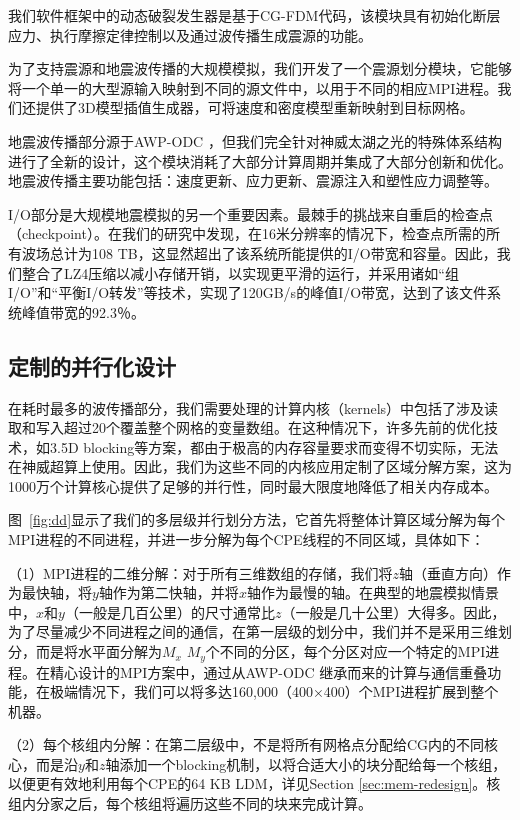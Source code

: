 \documentclass[degree=doctor]{thuthesis}
\begin{document}
我们软件框架中的动态破裂发生器是基于CG-FDM代码\citep{zhang2014three}，该模块具有初始化断层应力、执行摩擦定律控制以及通过波传播生成震源的功能。

为了支持震源和地震波传播的大规模模拟，我们开发了一个震源划分模块，它能够将一个单一的大型源输入映射到不同的源文件中，以用于不同的相应MPI进程。我们还提供了3D模型插值生成器，可将速度和密度模型重新映射到目标网格。

地震波传播部分源于AWP-ODC \citep {cui2010scalable}，但我们完全针对神威太湖之光的特殊体系结构进行了全新的设计，这个模块消耗了大部分计算周期并集成了大部分创新和优化。地震波传播主要功能包括：速度更新、应力更新、震源注入和塑性应力调整等。

I/O部分是大规模地震模拟的另一个重要因素。最棘手的挑战来自重启的检查点（checkpoint）。在我们的研究中发现，在16米分辨率的情况下，检查点所需的所有波场总计为108 TB，这显然超出了该系统所能提供的I/O带宽和容量。因此，我们整合了LZ4压缩以减小存储开销，以实现更平滑的运行，并采用诸如“组I/O”和“平衡I/O转发”等技术，实现了120GB/s的峰值I/O带宽，达到了该文件系统峰值带宽的92.3％。

\subsection{定制的并行化设计}
\label{sec:parallel}

在耗时最多的波传播部分，我们需要处理的计算内核（kernels）中包括了涉及读取和写入超过20个覆盖整个网格的变量数组。在这种情况下，许多先前的优化技术，如3.5D blocking等方案\citep {nguyen20103}，都由于极高的内存容量要求而变得不切实际，无法在神威超算上使用。因此，我们为这些不同的内核应用定制了区域分解方案，这为1000万个计算核心提供了足够的并行性，同时最大限度地降低了相关内存成本。

图~\ref{fig:dd}显示了我们的多层级并行划分方法，它首先将整体计算区域分解为每个MPI进程的不同进程，并进一步分解为每个CPE线程的不同区域，具体如下：

（1）MPI进程的二维分解：对于所有三维数组的存储，我们将$ z $轴（垂直方向）作为最快轴，将$ y $轴作为第二快轴，并将$ x $轴作为最慢的轴。在典型的地震模拟情景中，$ x $和$ y $（一般是几百公里）的尺寸通常比$ z $（一般是几十公里）大得多。因此，为了尽量减少不同进程之间的通信，在第一层级的划分中，我们并不是采用三维划分，而是将水平面分解为$ M_x $ $ M_y $个不同的分区，每个分区对应一个特定的MPI进程。在精心设计的MPI方案中，通过从AWP-ODC \citep{cui2010scalable}继承而来的计算与通信重叠功能，在极端情况下，我们可以将多达160,000（400×400）个MPI进程扩展到整个机器。

（2）每个核组内分解：在第二层级中，不是将所有网格点分配给CG内的不同核心，而是沿$ y $和$ z $轴添加一个blocking机制，以将合适大小的块分配给每一个核组，以便更有效地利用每个CPE的64 KB LDM，详见Section \ref{sec:mem-redesign}。核组内分家之后，每个核组将遍历这些不同的块来完成计算。
\end{document}

